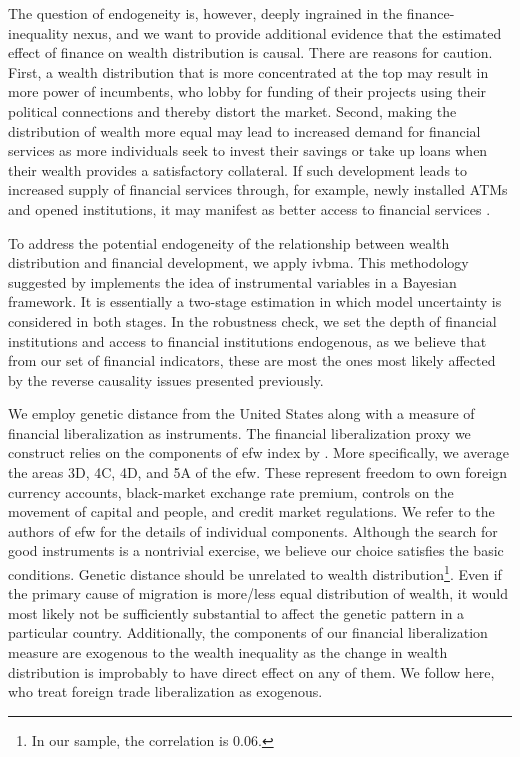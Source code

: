 \documentclass[a4paper,11pt]{article}
\begin{document}
The question of endogeneity is, however, deeply ingrained in the finance-inequality nexus, and we want to provide additional evidence that the estimated effect of finance on wealth distribution is causal. There are reasons for caution. First, a wealth distribution that is more concentrated at the top may result in more power of incumbents, who lobby for funding of their projects using their political connections and thereby distort the market. Second, making the distribution of wealth more equal may lead to increased demand for financial services as more individuals seek to invest their savings or take up loans when their wealth provides a satisfactory collateral. If such development leads to increased supply of financial services through, for example, newly installed ATMs and opened institutions, it may manifest as better access to financial services \citep{beck2007finance}.

To address the potential endogeneity of the relationship between wealth distribution and financial development, we apply \ac{ivbma}. This methodology suggested by \cite{KarlLenkoski2012} implements the idea of instrumental variables in a Bayesian framework. It is essentially a two-stage estimation in which model uncertainty is considered in both stages. In the robustness check, we set the depth of financial institutions and access to financial institutions endogenous, as we believe that from our set of financial indicators, these are most the ones most likely affected by the reverse causality issues presented previously.

We employ genetic distance from the United States \citep{spolaore2009diffusion} along with a measure of financial liberalization as instruments. The financial liberalization proxy we construct relies on the components of \ac{efw} index by \citep{gwartney2017}. More specifically, we average the areas 3D, 4C, 4D, and 5A of the \ac{efw}. These represent freedom to own foreign currency accounts, black-market exchange rate premium, controls on the movement of capital and people, and credit market regulations. We refer to the authors of \ac{efw} for the details of individual components. Although the search for good instruments is a nontrivial exercise, we believe our choice satisfies the basic conditions. Genetic distance should be unrelated to wealth distribution\footnote{In our sample, the correlation is 0.06.}. Even if the primary cause of migration is more/less equal distribution of wealth, it would most likely not be sufficiently substantial to affect the genetic pattern in a particular country. Additionally, the components of our financial liberalization measure are exogenous to the wealth inequality as the change in wealth distribution is improbably to have direct effect on any of them. We follow \citet{estev} here, who treat foreign trade liberalization as exogenous.
\end{document}
